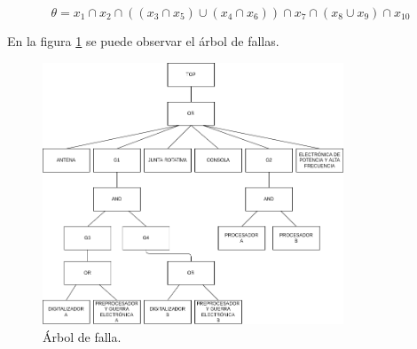 \documentclass[
    11pt,
    spanish,
    a4paper
]{article}
\begin{document}
\begin{dmath}
	\theta = x_1 \cap x_2 \cap ( (x_3 \cap x_5) \cup (x_4 \cap x_6) ) \cap x_7 \cap (x_8 \cup x_9) \cap x_{10}
\end{dmath}

En la figura \ref{fig:arbol} se puede observar el árbol de fallas.

\begin{figure}[htbp]
	\centering
	\includegraphics[width=0.8\textwidth]{img/arbol_radar.png}
	\caption{Árbol de falla.}
	\label{fig:arbol}
\end{figure}
\end{document}
